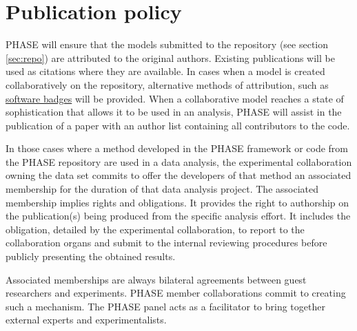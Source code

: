 \section{Publication policy}
\label{sec:publications}
PHASE will ensure that the models submitted to the repository (see section \ref{sec:repo}) are attributed to the original authors. Existing publications will be used as citations where they are available. In cases when a model is created collaboratively on the repository, alternative methods of attribution, such as \href{http://openbadges.org}{software badges} will be provided. When a collaborative model reaches a state of sophistication that allows it to be used in an analysis, PHASE will assist in the publication of a paper with an author list containing all contributors to the code.

In those cases where a method developed in the PHASE framework or code from the PHASE repository are used in a data analysis, the experimental collaboration owning the data set commits to offer the developers of that method an associated membership for the duration of that data analysis project. The associated membership implies rights and obligations. It provides the right to authorship on the publication(s) being produced from the specific analysis effort. It includes the obligation, detailed by the experimental collaboration, to report to the collaboration organs and submit to the internal reviewing procedures before publicly presenting the obtained results. 

Associated memberships are always bilateral agreements between guest researchers and experiments. PHASE member collaborations commit to creating such a mechanism. The PHASE panel acts as a facilitator to bring together external experts and experimentalists.